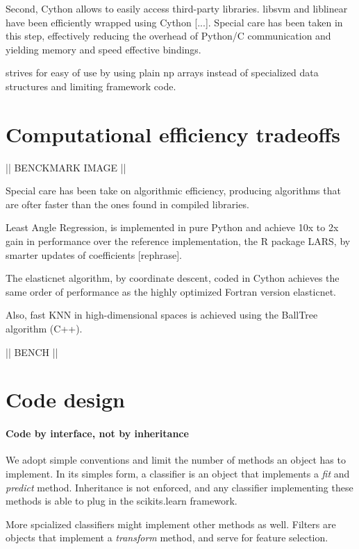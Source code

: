 \documentclass[twoside,11pt]{article}
\begin{document}
Second, Cython allows to easily access third-party libraries. libsvm
and liblinear have been efficiently wrapped using Cython [...]. Special
care has been taken in this step, effectively reducing the overhead of
Python/C communication and yielding memory and speed effective bindings.



strives for easy of use by using plain np arrays instead of specialized
data structures and limiting framework code.


\section{Computational efficiency tradeoffs}

|| BENCKMARK IMAGE ||


Special care has been take on algorithmic efficiency, producing
algorithms that are ofter faster than the ones found in compiled
libraries.



Least Angle Regression, is implemented in pure Python and achieve 10x
to 2x gain in performance over the reference implementation, the R
package LARS, by smarter updates of coefficients [rephrase].


The elasticnet algorithm, by coordinate descent, coded in Cython
achieves the same order of performance as the highly optimized Fortran
version elasticnet.

Also, fast KNN in high-dimensional spaces is achieved using the
BallTree algorithm (C++).

|| BENCH ||

\section{Code design}

\paragraph{Code by interface, not by inheritance}
%
We adopt simple conventions and limit the number of methods an object
has to implement. In its simples form, a classifier is an object that
implements a \emph{fit} and \emph{predict} method. Inheritance is not
enforced, and any classifier implementing these methods is able to
plug in the scikits.learn framework.


More spcialized classifiers might implement other methods as
well. Filters are objects that implement a \emph{transform} method,
and serve for feature selection.
\end{document}
